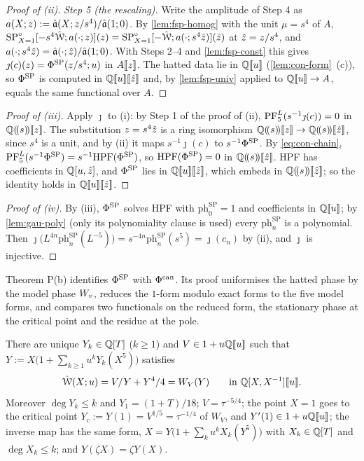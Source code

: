 \begin{proof}[Proof of (ii)]
\emph{Step 5 (the rescaling).} Write the amplitude of Step 4 as $a(X;z):=\hat{\mathfrak{a}}(X;z/s^4)/\hat{\mathfrak{a}}(1;0)$. By \cref{lem:fsp-homog} with the unit $\mu=s^4$ of $A$, $\mathrm{SP}^{\circ}_{X=1}[-s^4\hat{\mathcal{W}};a(\cdot;z)](z)=\mathrm{SP}^{\circ}_{X=1}[-\hat{\mathcal{W}};a(\cdot;s^4\hat{z})](\hat{z})$ at $\hat{z}=z/s^4$, and $a(\cdot;s^4\hat{z})=\hat{\mathfrak{a}}(\cdot;\hat{z})/\hat{\mathfrak{a}}(1;0)$. With Steps 2--4 and \cref{lem:fsp-const} this gives $\jmath(c)(z)=\Phi^{\mathrm{SP}}(z/s^4;u)$ in $A[\![ z ]\!]$. The hatted data lie in $\mathbb{Q}[\![ u ]\!]$ (\cref{lem:con-form}~(c)), so $\Phi^{\mathrm{SP}}$ is computed in $\mathbb{Q}[\![ u ]\!][\![ \hat{z} ]\!]$ and, by \cref{lem:fsp-univ} applied to $\mathbb{Q}[\![ u ]\!]\to A$, equals the same functional over $A$.
\end{proof}

\begin{proof}[Proof of (iii)]
Apply $\jmath$ to (i): by Step 1 of the proof of (ii), $\mathrm{PF}_{5}^{L}(s^{-1}\jmath(c))=0$ in $\mathbb{Q}(\!(s)\!)[\![ z ]\!]$. The substitution $z=s^4\hat{z}$ is a ring isomorphism $\bbQ\lser{s}\fps{z}\to\bbQ\lser{s}\fps{\zh}$, since $s^4$ is a unit, and by (ii) it maps $s^{-1}\jmath(c)$ to $s^{-1}\Phi^{\mathrm{SP}}$. By \eqref{eq:con-chain}, $\mathrm{PF}_{5}^{L}(s^{-1}\Phi^{\mathrm{SP}})=s^{-1}\mathrm{HPF}(\Phi^{\mathrm{SP}})$, so $\mathrm{HPF}(\Phi^{\mathrm{SP}})=0$ in $\mathbb{Q}(\!(s)\!)[\![ \hat{z} ]\!]$. HPF has coefficients in $\mathbb{Q}[u,\hat{z}]$, and $\Phi^{\mathrm{SP}}$ lies in $\mathbb{Q}[\![ u ]\!][\![ \hat{z} ]\!]$, which embeds in $\mathbb{Q}(\!(s)\!)[\![ \hat{z} ]\!]$; so the identity holds in $\mathbb{Q}[\![ u ]\!][\![ \hat{z} ]\!]$.
\end{proof}

\begin{proof}[Proof of (iv)]
By (iii), $\Phi^{\mathrm{SP}}$ solves HPF with $\mathrm{ph}^{\mathrm{SP}}_0=1$ and coefficients in $\mathbb{Q}[\![ u ]\!]$; by \cref{lem:gau-poly} (only its polynomiality clause is used) every $\mathrm{ph}^{\mathrm{SP}}_n$ is a polynomial. Then $\jmath\bigl(L^{4n}\mathrm{ph}^{\mathrm{SP}}_n(L^{-5})\bigr)=s^{-4n}\mathrm{ph}^{\mathrm{SP}}_n(s^5)=\jmath(c_n)$ by (ii), and $\jmath$ is injective.
\end{proof}

Theorem P(b) identifies $\Phi^{\mathrm{SP}}$ with $\Phi^{\mathrm{can}}$. Its proof uniformises the hatted phase by the model phase $W_{v}$, reduces the $1$-form modulo exact forms to the five model forms, and compares two functionals on the reduced form, the stationary phase at the critical point and the residue at the pole.

\begin{lem}
\label{lem:con-cfu}
There are unique $Y_k\in\mathbb{Q}[T]$ ($k\geq1$) and $V\in1+u\mathbb{Q}[\![ u ]\!]$ such that $Y:=X\bigl(1+\sum_{k\geq1}u^kY_k(X^5)\bigr)$ satisfies
\[
\hat{\mathcal{W}}(X;u)=V/Y+Y^4/4=W_V(Y)\qquad\text{in }\mathbb{Q}[X,X^{-1}][\![ u ]\!].
\]
Moreover $\deg Y_k\leq k$ and $Y_1=(1+T)/18$; $V=\tau^{-5/4}$; the point $X=1$ goes to the critical point $Y_c:=Y(1)=V^{1/5}=\tau^{-1/4}$ of $W_V$, and $Y'(1)\in1+u\mathbb{Q}[\![ u ]\!]$; the inverse map has the same form, $X=Y\bigl(1+\sum_ku^kX_k(Y^5)\bigr)$ with $X_k\in\mathbb{Q}[T]$ and $\deg X_k\leq k$; and $Y(\zeta X)=\zeta Y(X)$.
\end{lem}

